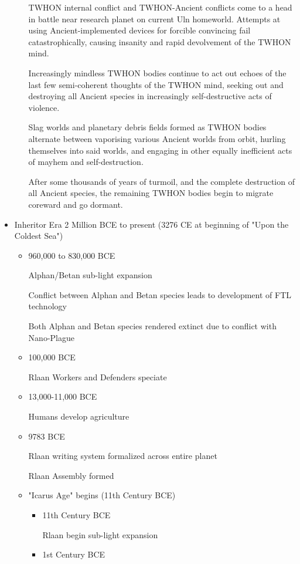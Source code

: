 \begin{itemize}
\begin{itemize}
TWHON internal conflict and TWHON-Ancient conflicts come to a head in
battle near research planet on current Uln homeworld. Attempts at
using Ancient-implemented devices for forcible convincing fail
catastrophically, causing insanity and rapid devolvement of the TWHON
mind.

Increasingly mindless TWHON bodies continue to act out echoes of the
last few semi-coherent thoughts of the TWHON mind, seeking out and
destroying all Ancient species in increasingly self-destructive acts
of violence.

Slag worlds and planetary debris fields formed as TWHON bodies
alternate between vaporising various Ancient worlds from orbit,
hurling themselves into said worlds, and engaging in other equally
inefficient acts of mayhem and self-destruction.

After some thousands of years of turmoil, and the complete destruction
of all Ancient species, the remaining TWHON bodies begin to migrate
coreward and go dormant.

\end{itemize}
\item Inheritor Era  2 Million BCE to present (3276 CE at beginning of "Upon the Coldest Sea")
\begin{itemize}
\item	 960,000 to  830,000 BCE 

Alphan/Betan sub-light expansion 

Conflict between Alphan and Betan species leads to development of FTL technology 

Both Alphan and Betan species rendered extinct due to conflict with Nano-Plague 
\item	 100,000 BCE 

Rlaan Workers and Defenders speciate 
\item	 13,000-11,000 BCE 

Humans develop agriculture 
\item	9783 BCE 

Rlaan writing system formalized across entire planet 

Rlaan Assembly formed 

\item "Icarus Age" begins (11th Century BCE)
\begin{itemize}
\item	11th Century BCE 

Rlaan begin sub-light expansion 
\item	1st Century BCE 


\end{itemize}
\end{itemize}
\end{itemize}
